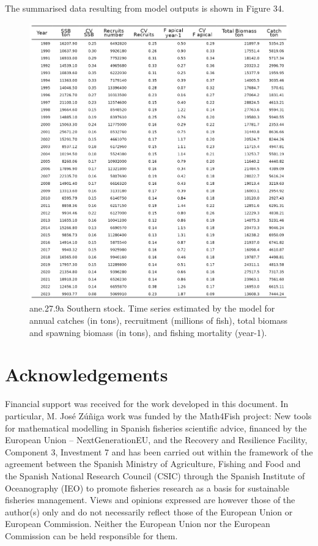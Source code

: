 \documentclass[
]{article}
\begin{document}
The summarised data resulting from model outputs is shown in Figure 34.

\begin{figure}[H]

{\centering \includegraphics[width=0.95\linewidth]{report/run/S1.0_4FLEETS_SelECO_RecIndex_Mnewfix/tb_timeseries} 

}

\caption{ane.27.9a Southern stock. Time series estimated by the model for annual catches (in tons), recruitment (millions of fish), total biomass and spawning biomass (in tons), and fishing mortality (year-1).}\label{fig:unnamed-chunk-66}
\end{figure}

\hypertarget{acknowledgements}{%
\section{Acknowledgements}\label{acknowledgements}}

Financial support was received for the work developed in this document.
In particular, M. José Zúñiga work was funded by the Math4Fish project:
New tools for mathematical modelling in Spanish fisheries scientific
advice, financed by the European Union -- NextGenerationEU, and the
Recovery and Resilience Facility, Component 3, Investment 7 and has been
carried out within the framework of the agreement between the Spanish
Ministry of Agriculture, Fishing and Food and the Spanish National
Research Council (CSIC) through the Spanish Institute of Oceanography
(IEO) to promote fisheries research as a basis for sustainable fisheries
management. Views and opinions expressed are however those of the
author(s) only and do not necessarily reflect those of the European
Union or European Commission. Neither the European Union nor the
European Commission can be held responsible for them.
\end{document}

